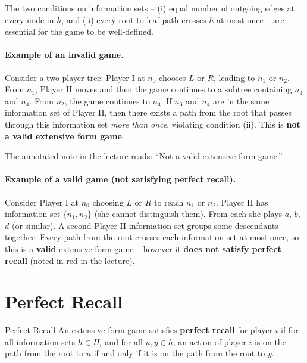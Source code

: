 \documentclass[12pt, a4paper]{article}
\begin{document}
The two conditions on information sets -- (i) equal number of outgoing edges at every node in $h$, and (ii) every root-to-leaf path crosses $h$ at most once -- are essential for the game to be well-defined.

\paragraph{Example of an invalid game.}
Consider a two-player tree: Player I at $n_0$ chooses $L$ or $R$, leading to $n_1$ or $n_2$. From $n_1$, Player II moves and then the game continues to a subtree containing $n_3$ and $n_4$. From $n_2$, the game continues to $n_4$. If $n_3$ and $n_4$ are in the same information set of Player II, then there exists a path from the root that passes through this information set \emph{more than once}, violating condition (ii). This is \textbf{not a valid extensive form game}.

\begin{notebox}
The annotated note in the lecture reads: ``Not a valid extensive form game.''
\end{notebox}

\paragraph{Example of a valid game (not satisfying perfect recall).}
Consider Player I at $n_0$ choosing $L$ or $R$ to reach $n_1$ or $n_2$. Player II has information set $\{n_1, n_2\}$ (she cannot distinguish them). From each she plays $a$, $b$, $d$ (or similar). A second Player II information set groups some descendants together. Every path from the root crosses each information set at most once, so this is a \textbf{valid} extensive form game -- however it \textbf{does not satisfy perfect recall} (noted in red in the lecture).

\section{Perfect Recall}

\begin{defbox}{Perfect Recall}
An extensive form game satisfies \textbf{perfect recall} for player $i$ if for all information sets $h \in H_i$ and for all $u, y \in h$, an action of player $i$ is on the path from the root to $u$ if and only if it is on the path from the root to $y$.
\end{defbox}
\end{document}
